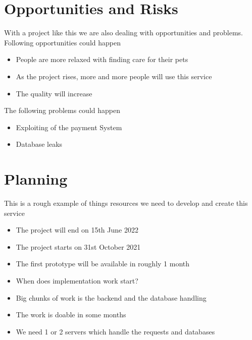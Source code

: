\documentclass[12pt]{article}
\theoremstyle{definition}
\newenvironment{explanation}{%
   \setlength{\parindent}{0pt}
   \itshape
   \color{blue}
}{}
\begin{document}
\pagebreak
\section{Opportunities and Risks}
\begin{explanation}
With a project like this we are also dealing with opportunities and problems.
\end{explanation}
\linebreak
Following opportunities could happen
\begin{itemize}
\item People are more relaxed with finding care for their pets
\item As the project rises, more and more people will use this service
\item The quality will increase
\end{itemize}

The following problems could happen
\begin{itemize}
\item Exploiting of the payment System
\item Database leaks
\end{itemize}

\pagebreak
\section{Planning}
\begin{explanation}
This is a rough example of things resources we need to develop and create this service
\end{explanation}
\begin{itemize}
\item The project will end on 15th June 2022
\item The project starts on 31st October 2021
\item The first prototype will be available in roughly 1 month
\item When does implementation work start?
\item Big chunks of work is the backend and the database handling
\item The work is doable in some months
\item We need 1 or 2 servers which handle the requests and databases
\end{itemize}
\end{document}
